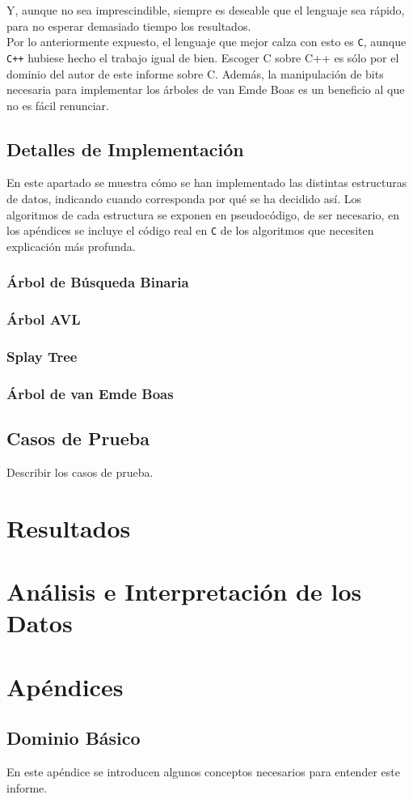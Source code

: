 \documentclass[12pt,letterpaper]{report}
\begin{document}
Y, aunque no sea imprescindible, siempre es deseable que el lenguaje sea rápido, para no esperar demasiado tiempo los resultados.\\

Por lo anteriormente expuesto, el lenguaje que mejor calza con esto es \texttt{C}, aunque \texttt{C++} hubiese hecho el trabajo igual de bien. Escoger C sobre C++ es sólo por el dominio del autor de este informe sobre C. Además, la manipulación de bits necesaria para implementar los árboles de van Emde Boas es un beneficio al que no es fácil renunciar.

\subsection{Detalles de Implementación}
\label{subsec:detalles}
En este apartado se muestra cómo se han implementado las distintas estructuras de datos, indicando cuando corresponda por qué se ha decidido así. Los algoritmos de cada estructura se exponen en pseudocódigo, de ser necesario, en los apéndices se incluye el código real en \texttt{C} de los algoritmos que necesiten explicación más profunda.

\subsubsection{Árbol de Búsqueda Binaria}

\subsubsection{Árbol AVL}

\subsubsection{Splay Tree}

\subsubsection{Árbol de van Emde Boas}


\subsection{Casos de Prueba}
\label{subsec:casos_prueba}
Describir los casos de prueba.


\section{Resultados}
\section{Análisis e Interpretación de los Datos}
\section{Apéndices}
\subsection{Dominio Básico}
\label{subsec:apen_dombasico}
En este apéndice se introducen algunos conceptos necesarios para entender este informe. 
\end{document}
